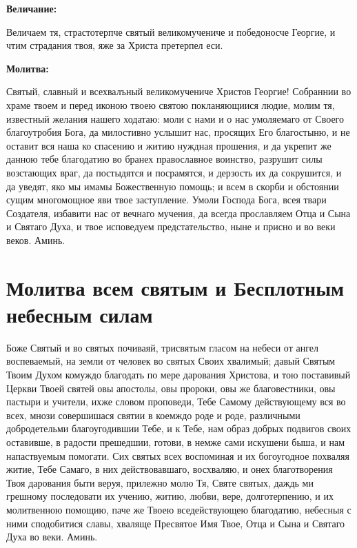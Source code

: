 \medskip
\bfseries Величание:\normalfont{}\nopagebreak


Величаем тя, страстотерпче святый великомучениче и победоносче Георгие, и чтим страдания твоя, яже за Христа претерпел еси.


\medskip
\bfseries Молитва:\normalfont{}\nopagebreak


Святый, славный и всехвалъный великомучениче Христов Георгие! Собраннии во храме твоем и перед иконою твоею святою покланяющиися людие, молим тя, известный желания нашего ходатаю: моли с нами и о нас умоляемаго от Своего благоутробия Бога, да милостивно услышит нас, просящих Его благостыню, и не оставит вся наша ко спасению и житию нуждная прошения, и да укрепит же данною тебе благодатию во бранех православное воинство, разрушит силы возстающих враг, да постыдятся и посрамятся, и дерзость их да сокрушится, и да уведят, яко мы имамы Божественную помощь; и всем в скорби и обстоянии сущим многомощное яви твое заступление. Умоли Господа Бога, всея твари Создателя, избавити нас от вечнаго мучения, да всегда прославляем Отца и Сына и Святаго Духа, и твое исповедуем предстательство, ныне и присно и во веки веков. Аминь.
\mychapterending


 

\section{Молитва всем святым и Бесплотным небесным силам}
 


Боже Святый и во святых почиваяй, трисвятым гласом на небеси от ангел воспеваемый, на земли от человек во святых Своих хвалимый; давый Святым Твоим Духом комуждо благодать по мере дарования Христова, и тою поставивый Церкви Твоей святей овы апостолы, овы пророки, овы же благовестники, овы пастыри и учители, ихже словом проповеди, Тебе Самому действующему вся во всех, мнози совершишася святии в коемждо роде и роде, различными добродетельми благоугодившии Тебе, и к Тебе, нам образ добрых подвигов своих оставивше, в радости прешедшии, готови, в немже сами искушени быша, и нам напаствуемым помогати. Сих святых всех воспоминая и их богоугодное похваляя житие, Тебе Самаго, в них действовавшаго, восхваляю, и онех благотворения Твоя дарования быти веруя, прилежно молю Тя, Святе святых, даждь ми грешному последовати их учению, житию, любви, вере, долготерпению, и их молитвенною помощию, паче же Твоею вседействующею благодатию, небесныя с ними сподобитися славы, хваляще Пресвятое Имя Твое, Отца и Сына и Святаго Духа во веки. Аминь.

